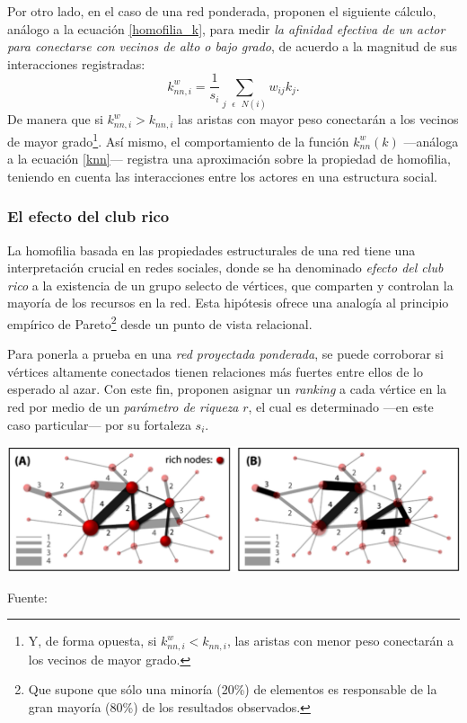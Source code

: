 \documentclass[letterpaper, 11pt]{book}
\theoremstyle{definition}
\theoremstyle{remark}
\begin{document}
Por otro lado, en el caso de una red ponderada, \citet{2004_Barrat_ComplexNetworks} proponen el siguiente cálculo, análogo a la ecuación \ref{homofilia_k}, para medir \emph{la afinidad efectiva de un actor para conectarse con vecinos de alto o bajo grado}, de acuerdo a la magnitud de sus interacciones registradas: 
\begin{equation}\label{homofilia_kw}
    k^{w}_{nn , i} = \frac{1}{s_{i}} \sum_{j \text{ } \epsilon \text{ } N(i)} w_{ij}k_{j}.
\end{equation} 
De manera que si $k^{w}_{nn , i} > k_{nn , i}$ las aristas con mayor peso conectarán a los vecinos de mayor grado\footnote{
    Y, de forma opuesta, si $k^{w}_{nn , i} < k_{nn , i}$, las aristas con menor peso conectarán a los vecinos de mayor grado.
}. 
Así mismo, el comportamiento de la función $k^{w}_{nn}(k)$ ---análoga a la ecuación \ref{knn}--- registra una aproximación sobre la propiedad de homofilia, teniendo en cuenta las interacciones entre los actores en una estructura social.





\subsubsection{El efecto del club rico}
\label{subsec:ClubRico}

La homofilia basada en las propiedades estructurales de una red tiene una interpretación crucial en redes sociales, donde se ha denominado \emph{efecto del club rico} a la existencia de un grupo selecto de vértices, que comparten y controlan la mayoría de los recursos en la red. 
Esta hipótesis ofrece una analogía al principio empírico de Pareto\footnote{
    Que supone que sólo una minoría (20\%) de elementos es responsable de la gran mayoría (80\%) de los resultados observados. 
} 
desde un punto de vista relacional. 

Para ponerla a prueba en una \emph{red proyectada ponderada}, se puede corroborar si vértices altamente conectados tienen relaciones más fuertes entre ellos de lo esperado al azar. 
Con este fin, \citet{2008_Ophsal_RichClub} proponen asignar un \emph{ranking} a cada vértice en la red por medio de un \emph{parámetro de riqueza} $r$, el cual es determinado ---en este caso particular--- por su fortaleza $s_{i}$. 

\hspace{-1.5em}\begin{minipage}{\linewidth}
\centering
{} \label{1.6_ClubRico}
\includegraphics[scale=.4]{img/1.6_ClubRico.png}
\par\bigskip
\small Fuente: \citep[2]{2008_Ophsal_RichClub}
\end{minipage}\bigskip
\end{document}
